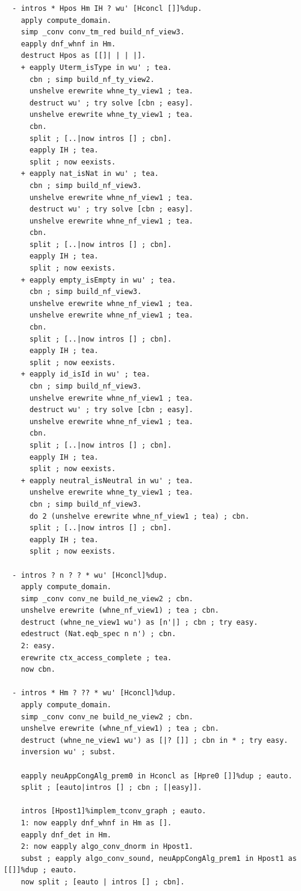 \begin{lstlisting}
  - intros * Hpos Hm IH ? wu' [Hconcl []]%dup. 
    apply compute_domain.
    simp _conv conv_tm_red build_nf_view3.
    eapply dnf_whnf in Hm.
    destruct Hpos as [[]| | | |].
    + eapply Uterm_isType in wu' ; tea.
      cbn ; simp build_nf_ty_view2.
      unshelve erewrite whne_ty_view1 ; tea.
      destruct wu' ; try solve [cbn ; easy].
      unshelve erewrite whne_ty_view1 ; tea.
      cbn.
      split ; [..|now intros [] ; cbn].
      eapply IH ; tea.
      split ; now eexists.
    + eapply nat_isNat in wu' ; tea.
      cbn ; simp build_nf_view3.
      unshelve erewrite whne_nf_view1 ; tea.
      destruct wu' ; try solve [cbn ; easy].
      unshelve erewrite whne_nf_view1 ; tea.
      cbn.
      split ; [..|now intros [] ; cbn].
      eapply IH ; tea.
      split ; now eexists.
    + eapply empty_isEmpty in wu' ; tea.
      cbn ; simp build_nf_view3.
      unshelve erewrite whne_nf_view1 ; tea.
      unshelve erewrite whne_nf_view1 ; tea.
      cbn.
      split ; [..|now intros [] ; cbn].
      eapply IH ; tea.
      split ; now eexists.
    + eapply id_isId in wu' ; tea.
      cbn ; simp build_nf_view3.
      unshelve erewrite whne_nf_view1 ; tea.
      destruct wu' ; try solve [cbn ; easy].
      unshelve erewrite whne_nf_view1 ; tea.
      cbn.
      split ; [..|now intros [] ; cbn].
      eapply IH ; tea.
      split ; now eexists.
    + eapply neutral_isNeutral in wu' ; tea.
      unshelve erewrite whne_ty_view1 ; tea.
      cbn ; simp build_nf_view3.
      do 2 (unshelve erewrite whne_nf_view1 ; tea) ; cbn.
      split ; [..|now intros [] ; cbn].
      eapply IH ; tea.
      split ; now eexists.
  
  - intros ? n ? ? * wu' [Hconcl]%dup.
    apply compute_domain.
    simp _conv conv_ne build_ne_view2 ; cbn.
    unshelve erewrite (whne_nf_view1) ; tea ; cbn.
    destruct (whne_ne_view1 wu') as [n'|] ; cbn ; try easy.
    edestruct (Nat.eqb_spec n n') ; cbn.
    2: easy.
    erewrite ctx_access_complete ; tea.
    now cbn.

  - intros * Hm ? ?? * wu' [Hconcl]%dup.
    apply compute_domain.
    simp _conv conv_ne build_ne_view2 ; cbn.
    unshelve erewrite (whne_nf_view1) ; tea ; cbn.
    destruct (whne_ne_view1 wu') as [|? []] ; cbn in * ; try easy.
    inversion wu' ; subst.

    eapply neuAppCongAlg_prem0 in Hconcl as [Hpre0 []]%dup ; eauto.
    split ; [eauto|intros [] ; cbn ; [|easy]].

    intros [Hpost1]%implem_tconv_graph ; eauto.
    1: now eapply dnf_whnf in Hm as [].
    eapply dnf_det in Hm.
    2: now eapply algo_conv_dnorm in Hpost1.
    subst ; eapply algo_conv_sound, neuAppCongAlg_prem1 in Hpost1 as [[]]%dup ; eauto.
    now split ; [eauto | intros [] ; cbn].


\end{lstlisting}
